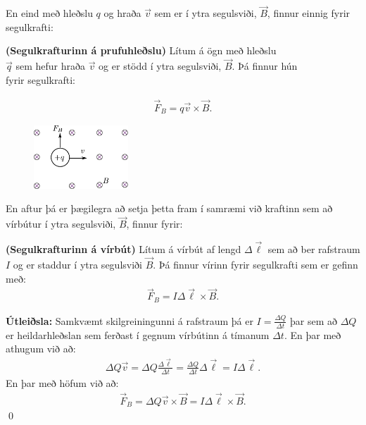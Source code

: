 \ifdefined \wholebook \else\documentclass[oneside]{book}\usepackage{EdlBook}\graphicspath{{figures/}}
\begin{document}
En eind með hleðslu $q$ og hraða $\vec{v}$ sem er í ytra segulsviði, $\vec{B}$, finnur einnig fyrir segulkrafti:
\begin{tcolorbox}
\begin{theorem}
\textbf{(Segulkrafturinn á prufuhleðslu)} Lítum á ögn með hleðslu \\ $\vec{q}$ sem hefur hraða $\vec{v}$ og er stödd í ytra segulsviði, $\vec{B}$. Þá finnur hún \\ fyrir segulkrafti:

\begin{align*}
    \vec{F}_B = q\vec{v} \times \vec{B}.
\end{align*}
\begin{minipage}{\linewidth}

\begin{figure}
\vspace{-2.75cm}
\includegraphics[width = 1.4in]{figures/segulsvid1.pdf}
\end{figure}
\phantom{.}
\end{minipage}
\end{theorem}
\end{tcolorbox}

En aftur þá er þægilegra að setja þetta fram í samræmi við kraftinn sem að vírbútur í ytra segulsviði, $\vec{B}$, finnur fyrir:

\begin{tcolorbox}
\begin{theorem}
\textbf{(Segulkrafturinn á vírbút)} Lítum á vírbút af lengd $\Delta \vec{\ell}$ sem að ber rafstraum $I$ og er staddur í ytra segulsviði $\vec{B}$. Þá finnur vírinn fyrir segulkrafti sem er gefinn með:
\begin{align*}
    \vec{F}_B = I \Delta \vec{\ell} \times \vec{B}.
\end{align*}
\end{theorem}
\end{tcolorbox}

\textbf{Útleiðsla:} Samkvæmt skilgreiningunni á rafstraum þá er $I = \frac{\Delta Q}{\Delta t}$ þar sem að $\Delta Q$ er heildarhleðslan sem ferðast í gegnum vírbútinn á tímanum $\Delta t$. En þar með athugum við að:
\begin{align*}
    \Delta Q  \vec{v} = \Delta Q \frac{\Delta \vec{\ell}}{\Delta t} = \frac{\Delta Q}{\Delta t} \Delta \vec{\ell} = I \Delta \vec{\ell}.
\end{align*}
En þar með höfum við að:
\begin{align*}
    \vec{F}_B = \Delta Q \vec{v} \times \vec{B} = I \Delta \vec{\ell} \times \vec{B}.
\end{align*}
\qed
\end{document}
